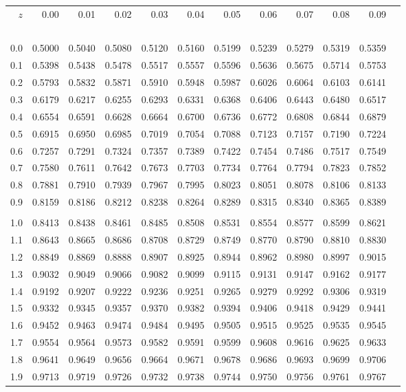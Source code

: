\documentclass[12pt,twoside]{article}
\begin{document}
{\begin{center}
\renewcommand{\arraystretch}{0.8}
\small
\begin{tabular}{rr@{\ }r@{\ }r@{\ }r@{\ }r@{\ }r@{\ }r@{\ }r@{\ }r@{\ }r@{\ }r}
$z$&0.00&0.01&0.02&0.03&0.04&0.05&0.06&0.07&0.08&0.09\\
\ \\
0.0&0.5000&0.5040&0.5080&0.5120&0.5160&0.5199&0.5239&0.5279&0.5319&0.5359\\
0.1&0.5398&0.5438&0.5478&0.5517&0.5557&0.5596&0.5636&0.5675&0.5714&0.5753\\
0.2&0.5793&0.5832&0.5871&0.5910&0.5948&0.5987&0.6026&0.6064&0.6103&0.6141\\
0.3&0.6179&0.6217&0.6255&0.6293&0.6331&0.6368&0.6406&0.6443&0.6480&0.6517\\
0.4&0.6554&0.6591&0.6628&0.6664&0.6700&0.6736&0.6772&0.6808&0.6844&0.6879\\
0.5&0.6915&0.6950&0.6985&0.7019&0.7054&0.7088&0.7123&0.7157&0.7190&0.7224\\
0.6&0.7257&0.7291&0.7324&0.7357&0.7389&0.7422&0.7454&0.7486&0.7517&0.7549\\
0.7&0.7580&0.7611&0.7642&0.7673&0.7703&0.7734&0.7764&0.7794&0.7823&0.7852\\
0.8&0.7881&0.7910&0.7939&0.7967&0.7995&0.8023&0.8051&0.8078&0.8106&0.8133\\
0.9&0.8159&0.8186&0.8212&0.8238&0.8264&0.8289&0.8315&0.8340&0.8365&0.8389\\
\\
1.0&0.8413&0.8438&0.8461&0.8485&0.8508&0.8531&0.8554&0.8577&0.8599&0.8621\\
1.1&0.8643&0.8665&0.8686&0.8708&0.8729&0.8749&0.8770&0.8790&0.8810&0.8830\\
1.2&0.8849&0.8869&0.8888&0.8907&0.8925&0.8944&0.8962&0.8980&0.8997&0.9015\\
1.3&0.9032&0.9049&0.9066&0.9082&0.9099&0.9115&0.9131&0.9147&0.9162&0.9177\\
1.4&0.9192&0.9207&0.9222&0.9236&0.9251&0.9265&0.9279&0.9292&0.9306&0.9319\\
1.5&0.9332&0.9345&0.9357&0.9370&0.9382&0.9394&0.9406&0.9418&0.9429&0.9441\\
1.6&0.9452&0.9463&0.9474&0.9484&0.9495&0.9505&0.9515&0.9525&0.9535&0.9545\\
1.7&0.9554&0.9564&0.9573&0.9582&0.9591&0.9599&0.9608&0.9616&0.9625&0.9633\\
1.8&0.9641&0.9649&0.9656&0.9664&0.9671&0.9678&0.9686&0.9693&0.9699&0.9706\\
1.9&0.9713&0.9719&0.9726&0.9732&0.9738&0.9744&0.9750&0.9756&0.9761&0.9767\\

\end{tabular}
\end{center}}
\end{document}
